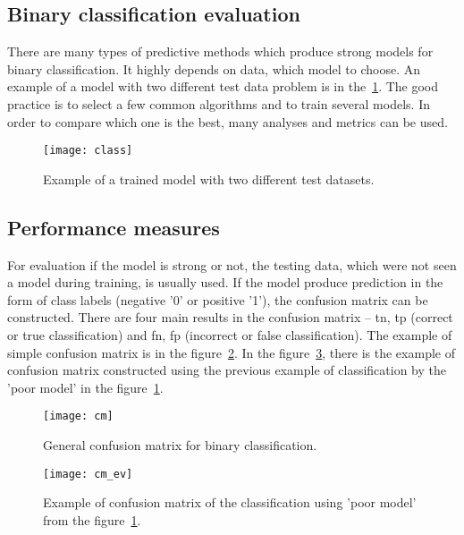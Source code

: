 \documentclass[thesis=M,english]{FITthesis}[2012/10/20]
\begin{document}
\subsection{Binary classification evaluation}

There are many types of predictive methods which produce strong models for binary classification. It highly depends on data, which model to choose. An example of a model with two different test data problem is in the~\ref{fig:classification}. The good practice is to select a few common algorithms and to train several models. In order to compare which one is the best, many analyses and metrics can be used. 

\vspace*{0.5cm}
\begin{figure}[ht]\centering
    \texttt{[image: class]}
    \caption{Example of a trained model with two different test datasets.}\label{fig:classification}
\end{figure}

\subsection{Performance measures}\label{sec:measures}
For evaluation if the model is strong or not, the testing data, which were not seen a model during training, is usually used. If the model produce prediction in the form of class labels (negative '0' or positive '1'), the confusion matrix can be constructed. There are four main results in the confusion matrix -- \gls{tn}, \gls{tp} (correct or true classification) and \gls{fn}, \gls{fp} (incorrect or false classification).\cite[3]{Saito2015rocprc} The example of simple confusion matrix is in the figure~\ref{fig:cm}. In the figure~\ref{fig:cm_ev}, there is the example of confusion matrix constructed using the previous example of classification by the 'poor model' in the figure~\ref{fig:classification}.

\begin{figure}[ht]\centering
    \texttt{[image: cm]}
    \caption{General confusion matrix for binary classification.}\label{fig:cm}
\end{figure}

\begin{figure}[ht]\centering
    \texttt{[image: cm\_ev]}
    \caption{Example of confusion matrix of the classification using 'poor model' from the figure~\ref{fig:classification}.}\label{fig:cm_ev}
\end{figure}
\end{document}
